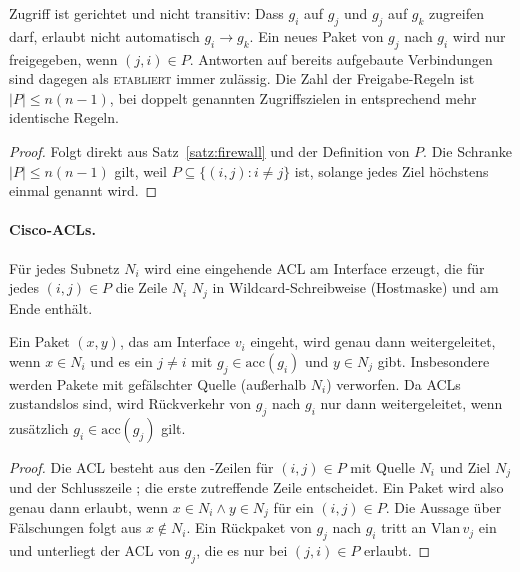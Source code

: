 \begin{korollar}
	Zugriff ist gerichtet und nicht transitiv: Dass $g_i$ auf $g_j$ und $g_j$ auf $g_k$ zugreifen darf, erlaubt nicht automatisch $g_i \to g_k$. Ein neues Paket von $g_j$ nach $g_i$ wird nur freigegeben, wenn $(j,i)\in P$. Antworten auf bereits aufgebaute Verbindungen sind dagegen als \textsc{etabliert} immer zulässig. Die Zahl der Freigabe-Regeln ist $|P|\le n(n-1)$, bei doppelt genannten Zugriffszielen in  entsprechend mehr identische Regeln.
\end{korollar}

\begin{proof}
	Folgt direkt aus Satz~\ref{satz:firewall} und der Definition von $P$. Die Schranke $|P| \le n(n-1)$ gilt, weil $P \subseteq \{(i,j): i \ne j\}$ ist, solange jedes Ziel höchstens einmal genannt wird.
\end{proof}

\paragraph{Cisco-ACLs.} Für jedes Subnetz $N_i$ wird eine eingehende ACL am Interface  erzeugt, die für jedes $(i,j)\in P$ die Zeile  $N_i$ $N_j$ in Wildcard-Schreibweise (Hostmaske) und am Ende  enthält.

\begin{satz}
\label{satz:cisco}
	Ein Paket $(x,y)$, das am Interface $v_i$ eingeht, wird genau dann weitergeleitet, wenn $x \in N_i$ und es ein $j\neq i$ mit $g_j \in \text{acc}(g_i)$ und $y\in N_j$ gibt. Insbesondere werden Pakete mit gefälschter Quelle (außerhalb $N_i$) verworfen. Da ACLs zustandslos sind, wird Rückverkehr von $g_j$ nach $g_i$ nur dann weitergeleitet, wenn zusätzlich $g_i \in \text{acc}(g_j)$ gilt.
\end{satz}

\begin{proof}
	Die ACL besteht aus den -Zeilen für $(i,j)\in P$ mit Quelle $N_i$ und Ziel $N_j$ und der Schlusszeile ; die erste zutreffende Zeile entscheidet. Ein Paket wird also genau dann erlaubt, wenn $x\in N_i \wedge y\in N_j$ für ein $(i,j)\in P$. Die Aussage über Fälschungen folgt aus $x\notin N_i$. Ein Rückpaket von $g_j$ nach $g_i$ tritt an $\text{Vlan}\,v_j$ ein und unterliegt der ACL von $g_j$, die es nur bei $(j,i)\in P$ erlaubt.
\end{proof}

